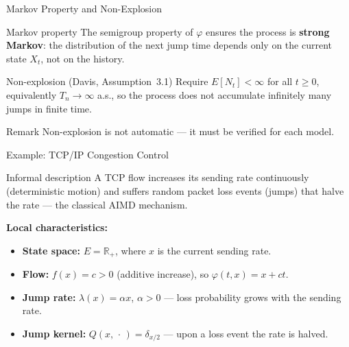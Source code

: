 \documentclass[aspectratio=169]{beamer}
\renewcommand{\phi}{\varphi}
\begin{document}
\begin{frame}{Markov Property and Non-Explosion}

  \begin{block}{Markov property}
    The semigroup property of $\varphi$ ensures the process is
    \textbf{strong Markov}: the distribution of the next jump time
    depends only on the current state $X_t$, not on the history.
  \end{block}

  \bigskip
  \begin{block}{Non-explosion (Davis, Assumption~3.1)}
    Require $E[N_t] < \infty$ for all $t \geq 0$, equivalently
    $T_n \to \infty$ a.s., so the process does not accumulate
    infinitely many jumps in finite time.
  \end{block}

  \bigskip
  \begin{alertblock}{Remark}
    Non-explosion is not automatic --- it must be verified for each
    model.
  \end{alertblock}

\end{frame}

\begin{frame}{Example: TCP/IP Congestion Control}

  \begin{block}{Informal description}
    A TCP flow increases its sending rate continuously (deterministic motion)
    and suffers random packet loss events (jumps) that halve the rate
    --- the classical AIMD mechanism.
  \end{block}

  \vfill
  \textbf{Local characteristics:}
  \begin{itemize}
    \setlength\itemsep{6pt}
    \item \textbf{State space:} $E = \mathbb{R}_+$, where $x$ is the current
          sending rate.

    \item \textbf{Flow:} $f(x) = c > 0$ (additive increase), so
          $\phi(t,x) = x + ct$.

    \item \textbf{Jump rate:} $\lambda(x) = \alpha x$, $\alpha > 0$ ---
          loss probability grows with the sending rate.

    \item \textbf{Jump kernel:} $Q(x,\,\cdot\,) = \delta_{x/2}$ ---
          upon a loss event the rate is halved.
  \end{itemize}
  \vfill
\end{frame}
\end{document}
